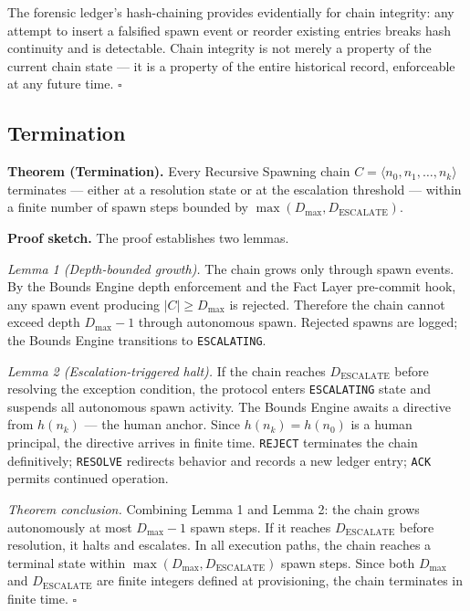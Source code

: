 The forensic ledger's hash-chaining provides evidentially for chain integrity: any attempt to insert a falsified spawn event or reorder existing entries breaks hash continuity and is detectable. Chain integrity is not merely a property of the current chain state — it is a property of the entire historical record, enforceable at any future time. $\square$

\subsection{Termination}
\label{sec:rs-termination}

\medskip
\noindent\textbf{Theorem (Termination).} Every Recursive Spawning chain $C = \langle n_0, n_1, \ldots, n_k \rangle$ terminates — either at a resolution state or at the escalation threshold — within a finite number of spawn steps bounded by $\max(D_{\mathrm{max}}, D_{\mathrm{ESCALATE}})$.

\medskip
\noindent\textbf{Proof sketch.} The proof establishes two lemmas.

\medskip
\textit{Lemma 1 (Depth-bounded growth).} The chain grows only through spawn events. By the Bounds Engine depth enforcement and the Fact Layer pre-commit hook, any spawn event producing $|C| \geq D_{\mathrm{max}}$ is rejected. Therefore the chain cannot exceed depth $D_{\mathrm{max}} - 1$ through autonomous spawn. Rejected spawns are logged; the Bounds Engine transitions to \texttt{ESCALATING}.

\medskip
\textit{Lemma 2 (Escalation-triggered halt).} If the chain reaches $D_{\mathrm{ESCALATE}}$ before resolving the exception condition, the protocol enters \texttt{ESCALATING} state and suspends all autonomous spawn activity. The Bounds Engine awaits a directive from $h(n_k)$ — the human anchor. Since $h(n_k) = h(n_0)$ is a human principal, the directive arrives in finite time. \texttt{REJECT} terminates the chain definitively; \texttt{RESOLVE} redirects behavior and records a new ledger entry; \texttt{ACK} permits continued operation.

\medskip
\textit{Theorem conclusion.} Combining Lemma 1 and Lemma 2: the chain grows autonomously at most $D_{\mathrm{max}} - 1$ spawn steps. If it reaches $D_{\mathrm{ESCALATE}}$ before resolution, it halts and escalates. In all execution paths, the chain reaches a terminal state within $\max(D_{\mathrm{max}}, D_{\mathrm{ESCALATE}})$ spawn steps. Since both $D_{\mathrm{max}}$ and $D_{\mathrm{ESCALATE}}$ are finite integers defined at provisioning, the chain terminates in finite time. $\square$

